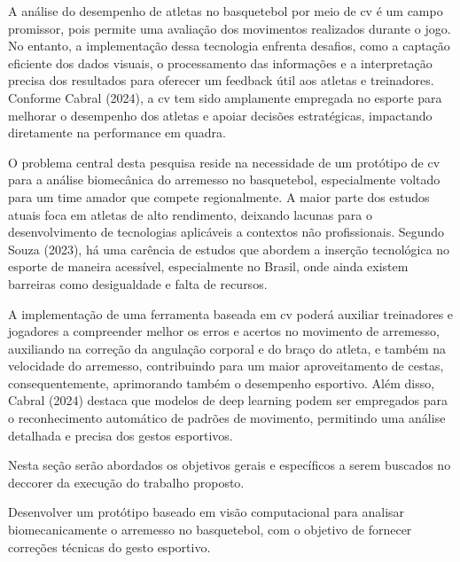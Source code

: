 \label{sec:problema-pesquisa-justificativa}

A análise do desempenho de atletas no basquetebol por meio de \ac{cv} é um campo promissor, 
pois permite uma avaliação dos movimentos realizados durante o jogo. No entanto, a implementação dessa tecnologia enfrenta desafios, 
como a captação eficiente dos dados visuais, o processamento das informações e a interpretação precisa dos resultados para oferecer um feedback útil aos atletas e treinadores. 
Conforme Cabral (2024), a \ac{cv} tem sido amplamente empregada no esporte para melhorar o desempenho dos atletas e apoiar decisões estratégicas, impactando diretamente na performance em quadra.

O problema central desta pesquisa reside na necessidade de um protótipo de \ac{cv} para a análise biomecânica do arremesso no basquetebol, 
especialmente voltado para um time amador que compete regionalmente. A maior parte dos estudos atuais foca em atletas de alto rendimento, 
deixando lacunas para o desenvolvimento de tecnologias aplicáveis a contextos não profissionais. 
Segundo Souza (2023), há uma carência de estudos que abordem a inserção tecnológica no esporte de maneira acessível, 
especialmente no Brasil, onde ainda existem barreiras como desigualdade e falta de recursos.

A implementação de uma ferramenta baseada em \ac{cv} poderá auxiliar treinadores e jogadores a compreender melhor os erros e acertos no movimento de arremesso, 
auxiliando na correção da angulação corporal e do braço do atleta, e também na velocidade do arremesso, contribuindo para um maior aproveitamento de cestas, consequentemente, 
aprimorando também o desempenho esportivo. Além disso, Cabral (2024) destaca que modelos de deep learning podem ser empregados para o reconhecimento automático de padrões de movimento, 
permitindo uma análise detalhada e precisa dos gestos esportivos.



\label{sec:objetivos}
Nesta seção serão abordados os objetivos gerais e específicos a serem buscados no deccorer da execução do trabalho proposto.

\label{ssec:objetivo-geral}

Desenvolver um protótipo baseado em visão computacional para analisar biomecanicamente o arremesso no basquetebol, com o objetivo de fornecer correções técnicas do gesto esportivo.

\label{ssec:objetivos-especificos}


